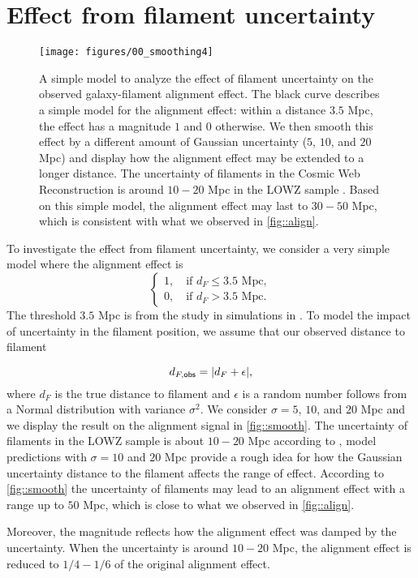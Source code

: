 \documentclass[usenatbib,useAMS]{mnras}
\theoremstyle{remark}
\begin{document}
{{{
%



\appendix

\section{Effect from filament uncertainty}	\label{sec::smooth}

\begin{figure}
\center
\texttt{[image: figures/00\_smoothing4]}
\caption{
A simple model to analyze the effect of filament uncertainty on the observed galaxy-filament
alignment effect. 
The black curve describes a simple model for the alignment effect: 
within a distance $3.5$ Mpc, the effect has a magnitude $1$ and $0$ otherwise.
We then smooth this effect by a different amount of Gaussian uncertainty ($5$, $10$, and $20$ Mpc)
and display how the alignment effect may be extended to a longer distance.
The uncertainty of filaments in the Cosmic Web Reconstruction is around $10-20$ Mpc in the LOWZ sample \citep{2016MNRAS.461.3896C}.
Based on this simple model, the alignment effect may last to $30-50$ Mpc, which is consistent with what we observed in 
\autoref{fig::align}.
}
\label{fig::smooth}
\end{figure}


To investigate the effect from filament uncertainty, we consider a very simple model where
the alignment effect is 
$$
\begin{cases}
1, \quad \mbox{if $d_F\leq 3.5$ Mpc},\\
0, \quad \mbox{if $d_F> 3.5$ Mpc}.
\end{cases}
$$
The threshold $3.5$ Mpc is from the study in simulations in \cite{2015MNRAS.454.3341C}.
To model the impact of uncertainty in the filament position,
we assume that our observed distance to filament 
{{
$$
d_{F, {\sf obs}} = |d_{F} + \epsilon|, 
$$
}
where $d_F$ is the true distance to filament
and $\epsilon $ is a random number follows from a Normal distribution
with variance $\sigma^2.$
We consider $\sigma=5$, $10$, and $20$ Mpc
and we display the result on the alignment signal in \autoref{fig::smooth}.
The uncertainty of filaments in the LOWZ sample is about $10-20$ Mpc according to
\cite{2016MNRAS.461.3896C}, model predictions with $\sigma=10$ and $20$ Mpc provide a rough idea for
how 
the Gaussian uncertainty  distance to the filament affects the range of effect.
According to
\autoref{fig::smooth}
the uncertainty of filaments may lead to an alignment effect with a range up to $50$ Mpc,
which is close to what we observed in \autoref{fig::align}. 
{{Moreover, the magnitude reflects how the alignment effect was damped by the uncertainty.
When the uncertainty is around $10-20$ Mpc, the alignment
effect is reduced to $1/4-1/6$ of the original alignment effect.}




}}}}}
\end{document}
